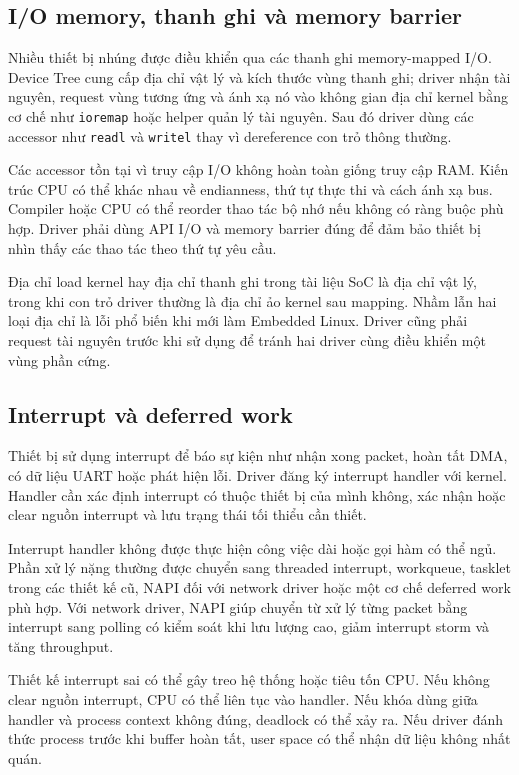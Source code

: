 \documentclass[11pt]{article}
\newcommand{\code}[1]{\texttt{#1}}
\begin{document}
\subsection{I/O memory, thanh ghi và memory barrier}

Nhiều thiết bị nhúng được điều khiển qua các thanh ghi memory-mapped I/O. Device Tree cung cấp địa chỉ vật lý và kích thước vùng thanh ghi; driver nhận tài nguyên, request vùng tương ứng và ánh xạ nó vào không gian địa chỉ kernel bằng cơ chế như \code{ioremap} hoặc helper quản lý tài nguyên. Sau đó driver dùng các accessor như \code{readl} và \code{writel} thay vì dereference con trỏ thông thường.

Các accessor tồn tại vì truy cập I/O không hoàn toàn giống truy cập RAM. Kiến trúc CPU có thể khác nhau về endianness, thứ tự thực thi và cách ánh xạ bus. Compiler hoặc CPU có thể reorder thao tác bộ nhớ nếu không có ràng buộc phù hợp. Driver phải dùng API I/O và memory barrier đúng để đảm bảo thiết bị nhìn thấy các thao tác theo thứ tự yêu cầu.

Địa chỉ load kernel hay địa chỉ thanh ghi trong tài liệu SoC là địa chỉ vật lý, trong khi con trỏ driver thường là địa chỉ ảo kernel sau mapping. Nhầm lẫn hai loại địa chỉ là lỗi phổ biến khi mới làm Embedded Linux. Driver cũng phải request tài nguyên trước khi sử dụng để tránh hai driver cùng điều khiển một vùng phần cứng.

\subsection{Interrupt và deferred work}

Thiết bị sử dụng interrupt để báo sự kiện như nhận xong packet, hoàn tất DMA, có dữ liệu UART hoặc phát hiện lỗi. Driver đăng ký interrupt handler với kernel. Handler cần xác định interrupt có thuộc thiết bị của mình không, xác nhận hoặc clear nguồn interrupt và lưu trạng thái tối thiểu cần thiết.

Interrupt handler không được thực hiện công việc dài hoặc gọi hàm có thể ngủ. Phần xử lý nặng thường được chuyển sang threaded interrupt, workqueue, tasklet trong các thiết kế cũ, NAPI đối với network driver hoặc một cơ chế deferred work phù hợp. Với network driver, NAPI giúp chuyển từ xử lý từng packet bằng interrupt sang polling có kiểm soát khi lưu lượng cao, giảm interrupt storm và tăng throughput.

Thiết kế interrupt sai có thể gây treo hệ thống hoặc tiêu tốn CPU. Nếu không clear nguồn interrupt, CPU có thể liên tục vào handler. Nếu khóa dùng giữa handler và process context không đúng, deadlock có thể xảy ra. Nếu driver đánh thức process trước khi buffer hoàn tất, user space có thể nhận dữ liệu không nhất quán.
\end{document}
